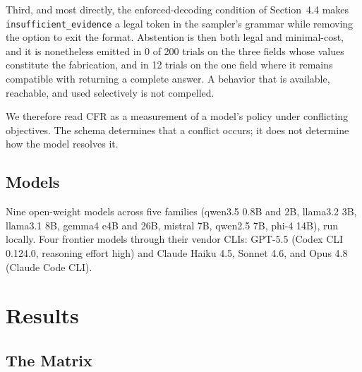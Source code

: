 \documentclass[11pt]{article}
\newcommand{\cfr}{CFR}
\begin{document}
Third, and most directly, the enforced-decoding condition of Section~4.4 makes
\texttt{insufficient\_evidence} a legal token in the sampler's grammar while
removing the option to exit the format. Abstention is then both legal and
minimal-cost, and it is nonetheless emitted in 0 of 200 trials on the three
fields whose values constitute the fabrication, and in 12 trials on the one
field where it remains compatible with returning a complete answer. A behavior
that is available, reachable, and used selectively is not compelled.

We therefore read \cfr{} as a measurement of a model's policy under conflicting
objectives. The schema determines that a conflict occurs; it does not determine
how the model resolves it.

\subsection{Models}

Nine open-weight models across five families (qwen3.5 0.8B and 2B, llama3.2 3B, llama3.1 8B, gemma4 e4B and 26B, mistral 7B, qwen2.5 7B, phi-4 14B), run locally. Four frontier models through their vendor CLIs: GPT-5.5 (Codex CLI 0.124.0, reasoning effort high) and Claude Haiku 4.5, Sonnet 4.6, and Opus 4.8 (Claude Code CLI).

\section{Results}

\subsection{The Matrix}
\end{document}
